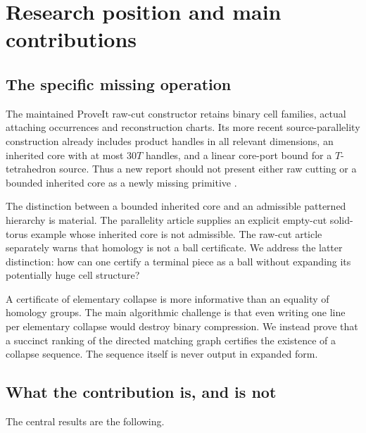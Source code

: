 \documentclass[11pt,letterpaper]{article}
\theoremstyle{definition}
\theoremstyle{remark}\newtheorem{remark}[theorem]{Remark}
\begin{document}
\section{Research position and main contributions}
\label{sec:position}

\subsection{The specific missing operation}

The maintained ProveIt raw-cut constructor retains binary cell families, actual attaching occurrences and reconstruction charts. Its more recent source-parallelity construction already includes product handles in all relevant dimensions, an inherited core with at most $30T$ handles, and a linear core-port bound for a $T$-tetrahedron source. Thus a new report should not present either raw cutting or a bounded inherited core as a newly missing primitive \cite{repo-cut,repo-parallelity}.

The distinction between a bounded inherited core and an admissible patterned hierarchy is material. The parallelity article supplies an explicit empty-cut solid-torus example whose inherited core is not admissible. The raw-cut article separately warns that homology is not a ball certificate. We address the latter distinction: how can one certify a terminal piece as a ball without expanding its potentially huge cell structure?

A certificate of elementary collapse is more informative than an equality of homology groups. The main algorithmic challenge is that even writing one line per elementary collapse would destroy binary compression. We instead prove that a succinct ranking of the directed matching graph certifies the existence of a collapse sequence. The sequence itself is never output in expanded form.

\subsection{What the contribution is, and is not}

The central results are the following.
\end{document}
